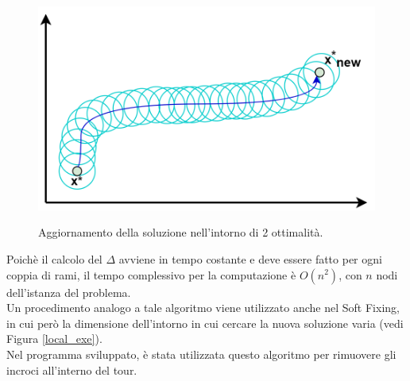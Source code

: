 \begin{figure}[H] 
\begin{center} 
  \includegraphics[scale=0.4]{Images/two_optimality}\\ 
  \caption{\footnotesize{Aggiornamento della soluzione nell'intorno di 2 ottimalità.}}
  \label{two_optimality}
\end{center}
\end{figure}
Poichè il calcolo del $\Delta$ avviene in tempo costante e deve essere fatto per ogni coppia di rami, il tempo complessivo per la computazione è $O(n^2)$, con $n$ nodi dell'istanza del problema.\\
Un procedimento analogo a tale algoritmo viene utilizzato anche nel Soft Fixing, in cui però la dimensione dell'intorno in cui cercare la nuova soluzione varia (vedi Figura \ref{local_exe}).\\
Nel programma sviluppato, è stata utilizzata questo algoritmo per rimuovere gli incroci all'interno del tour.
 
